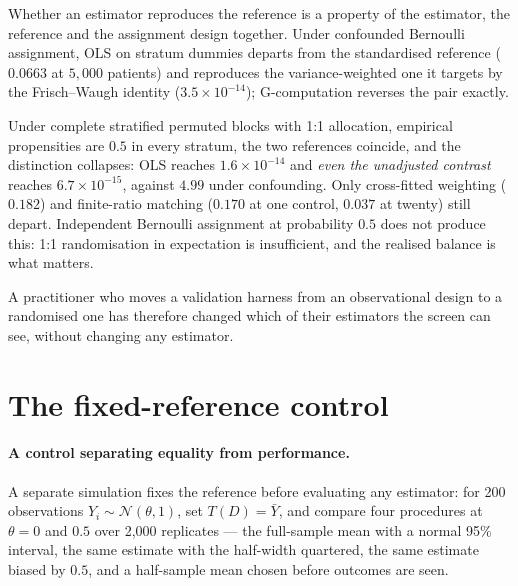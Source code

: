 Whether an estimator reproduces the reference is a property of the estimator,
the reference and the assignment design together. Under confounded Bernoulli
assignment, OLS on stratum dummies departs from the standardised reference
($0.0663$ at $5{,}000$ patients) and reproduces the variance-weighted one it
targets by the Frisch--Waugh identity ($3.5\times10^{-14}$); G-computation
reverses the pair exactly.

Under complete stratified permuted blocks with 1:1 allocation, empirical
propensities are $0.5$ in every stratum, the two references coincide, and the
distinction collapses: OLS reaches $1.6\times10^{-14}$ and \emph{even the
unadjusted contrast} reaches $6.7\times10^{-15}$, against $4.99$ under
confounding. Only cross-fitted weighting ($0.182$) and finite-ratio matching
($0.170$ at one control, $0.037$ at twenty) still depart. Independent Bernoulli
assignment at probability $0.5$ does not produce this: 1:1 randomisation in
expectation is insufficient, and the realised balance is what matters.

A practitioner who moves a validation harness from an observational design to
a randomised one has therefore changed which of their estimators the screen can
see, without changing any estimator.

\section{The fixed-reference control}
\label{app:cleancontrol}

\paragraph{A control separating equality from performance.}
A separate simulation fixes the reference before evaluating any estimator: for
200 observations $Y_i\sim\mathcal N(\theta,1)$, set $T(D)=\bar Y$, and
compare four procedures at $\theta=0$ and $0.5$ over 2{,}000 replicates --- the
full-sample mean with a normal 95\% interval, the same estimate with the
half-width quartered, the same estimate biased by $0.5$, and a half-sample
mean chosen before outcomes are seen.

